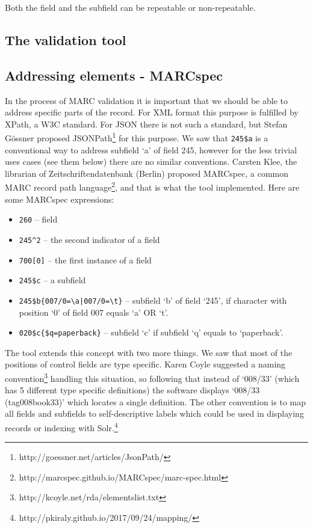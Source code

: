 Both the field and the subfield can be repeatable or non-repeatable.

\subsection{The validation tool}

\subsection{Addressing elements - MARCspec}

In the process of MARC validation it is important that we should be able to address specific parts of the record. For XML format this purpose is fulfilled by XPath, a W3C standard. For JSON there is not such a standard, but Stefan Gössner proposed JSONPath\footnote{http://goessner.net/articles/JsonPath/} for this purpose. We saw that \verb|245$a| is a conventional way to address subfield `a' of field 245, however for the less trivial uses cases (see them below) there are no similar conventions. Carsten Klee, the librarian of Zeitschriftendatenbank (Berlin) proposed MARCspec, a common MARC record path language\footnote{http://marcspec.github.io/MARCspec/marc-spec.html}, and that is what the tool implemented. Here are some MARCspec expressions:

\begin{itemize}
 \setlength{\parskip}{0pt}
 \setlength{\itemsep}{0pt plus 1pt}
  \item \verb|260| -- field
  \item \verb|245^2| -- the second indicator of a field
  \item \verb|700[0]| -- the first instance of a field
  \item \verb|245$c| -- a subfield
  \item \verb:245$b{007/0=\a|007/0=\t}: -- subfield ‘b’ of field ‘245’, if character with position ‘0’ of field 007 equals ‘a’ OR ‘t’.
  \item \verb|020$c{$q=paperback}| -- subfield ‘c’ if subfield ‘q’ equals to ‘paperback’.
\end{itemize}

The tool extends this concept with two more things. We saw that most of the positions of control fields are type specific. Karen Coyle suggested a naming convention\footnote{http://kcoyle.net/rda/elementslist.txt} handling this situation, so following that instead of `008/33' (which has 5 different type specific definitions) the software displays `008/33 (tag008book33)' which locates a single definition. The other convention is to map all fields and subfields to self-descriptive labels which could be used in displaying records or indexing with Solr.\footnote{http://pkiraly.github.io/2017/09/24/mapping/}

